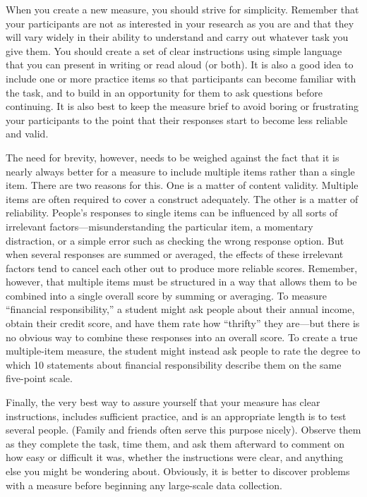 \documentclass[
]{krantz}
\begin{document}
When you create a new measure, you should strive for simplicity. Remember that your participants are not as interested in your research as you are and that they will vary widely in their ability to understand and carry out whatever task you give them. You should create a set of clear instructions using simple language that you can present in writing or read aloud (or both). It is also a good idea to include one or more practice items so that participants can become familiar with the task, and to build in an opportunity for them to ask questions before continuing. It is also best to keep the measure brief to avoid boring or frustrating your participants to the point that their responses start to become less reliable and valid.

The need for brevity, however, needs to be weighed against the fact that it is nearly always better for a measure to include multiple items rather than a single item. There are two reasons for this. One is a matter of content validity. Multiple items are often required to cover a construct adequately. The other is a matter of reliability. People's responses to single items can be influenced by all sorts of irrelevant factors---misunderstanding the particular item, a momentary distraction, or a simple error such as checking the wrong response option. But when several responses are summed or averaged, the effects of these irrelevant factors tend to cancel each other out to produce more reliable scores. Remember, however, that multiple items must be structured in a way that allows them to be combined into a single overall score by summing or averaging. To measure ``financial responsibility,'' a student might ask people about their annual income, obtain their credit score, and have them rate how ``thrifty'' they are---but there is no obvious way to combine these responses into an overall score. To create a true multiple-item measure, the student might instead ask people to rate the degree to which 10 statements about financial responsibility describe them on the same five-point scale.

Finally, the very best way to assure yourself that your measure has clear instructions, includes sufficient practice, and is an appropriate length is to test several people. (Family and friends often serve this purpose nicely). Observe them as they complete the task, time them, and ask them afterward to comment on how easy or difficult it was, whether the instructions were clear, and anything else you might be wondering about. Obviously, it is better to discover problems with a measure before beginning any large-scale data collection.
\end{document}
